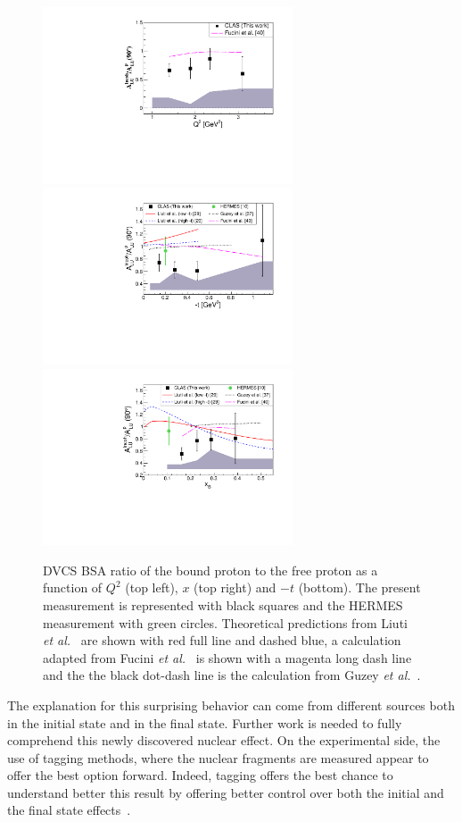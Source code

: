 \documentclass{article}
\begin{document}
\begin{figure}[tbp!]
\center
\includegraphics[width=7.4cm]{fig3/ALU_ratioInc_Q2_shortscenrario.pdf}
\includegraphics[width=7.4cm]{fig3/ALU_ratioInc_t_shortscenrario.pdf}
\includegraphics[width=7.4cm]{fig3/ALU_ratioInc_x_shortscenrario.pdf}
	\caption{DVCS BSA ratio of the bound proton to the free proton as a function of 
	$Q^2$ (top left), $x$ (top right) and $-t$ (bottom). The present measurement is 
	represented with black squares and the HERMES 
	measurement \cite{Airapetian:2009cga} with green circles. Theoretical predictions 
	from Liuti {\it et al.}~\cite{Liuti:2005gi,GonzalezHernandez:2012jv} are shown 
	with red full line and dashed blue, a calculation adapted from Fucini 
	{\it et al.}~\cite{Fucini:2019xlc} is shown with a magenta long dash line and the
	the black dot-dash line is the calculation from Guzey {\it et al.}~\cite{Guzey:2008th}.}
\label{fig:IncRatios}
\end{figure}

The explanation for this surprising behavior can come from different sources
both in the initial state and in the final state. 
Further work is needed to fully comprehend this newly discovered nuclear effect. On the 
experimental side, the use of tagging methods, where the nuclear fragments are measured
appear to offer the best option forward. Indeed, tagging offers the best chance to understand better
this result by offering better control over both the initial and the final state 
effects~\cite{Dupre:2015jha}.
\end{document}
